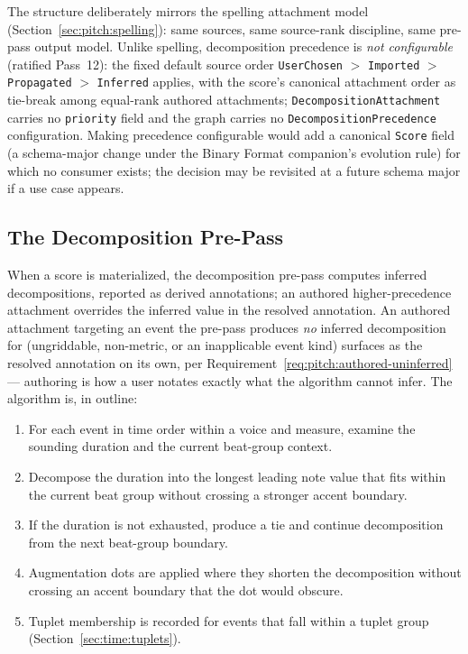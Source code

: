 \documentclass[11pt,letterpaper]{report}
\begin{document}
The structure deliberately mirrors the spelling attachment model
(Section~\ref{sec:pitch:spelling}): same sources, same source-rank
discipline, same pre-pass output model. Unlike spelling, decomposition
precedence is \emph{not configurable} (ratified Pass~12): the fixed
default source order \texttt{UserChosen} $>$ \texttt{Imported} $>$
\texttt{Propagated} $>$ \texttt{Inferred} applies, with the score's
canonical attachment order as tie-break among equal-rank authored
attachments; \texttt{DecompositionAttachment} carries no
\texttt{priority} field and the graph carries no
\texttt{DecompositionPrecedence} configuration. Making precedence
configurable would add a canonical \texttt{Score} field (a
schema-major change under the Binary Format companion's evolution
rule) for which no consumer exists; the decision may be revisited at
a future schema major if a use case appears.

\subsection{The Decomposition Pre-Pass}

When a score is materialized, the decomposition pre-pass computes
inferred decompositions, reported as derived annotations; an authored
higher-precedence attachment overrides the inferred value in the
resolved annotation. An authored attachment targeting an event the
pre-pass produces \emph{no} inferred decomposition for (ungriddable,
non-metric, or an inapplicable event kind) surfaces as the resolved
annotation on its own, per
Requirement~\ref{req:pitch:authored-uninferred} --- authoring is how
a user notates exactly what the algorithm cannot infer. The
algorithm is, in outline:

\begin{enumerate}
  \item For each event in time order within a voice and measure,
    examine the sounding duration and the current beat-group context.
  \item Decompose the duration into the longest leading note value
    that fits within the current beat group without crossing a stronger
    accent boundary.
  \item If the duration is not exhausted, produce a tie and continue
    decomposition from the next beat-group boundary.
  \item Augmentation dots are applied where they shorten the
    decomposition without crossing an accent boundary that the dot would
    obscure.
  \item Tuplet membership is recorded for events that fall within a
    tuplet group (Section~\ref{sec:time:tuplets}).
\end{enumerate}
\end{document}
